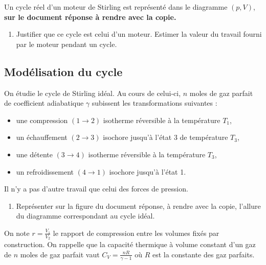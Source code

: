 \documentclass[
  10pt,
  french,
  a4paper,
  DIV=18]{scrartcl}
\providecommand{\tightlist}{%
  \setlength{\itemsep}{0pt}\setlength{\parskip}{0pt}}
\begin{document}
Un cycle réel d'un moteur de Stirling est représenté dans le diagramme
\((p,V)\), \textbf{sur le document réponse à rendre avec la copie.}

\begin{enumerate}
\def\labelenumi{\arabic{enumi}.}
\tightlist
\item
  Justifier que ce cycle est celui d'un moteur. Estimer la valeur du
  travail fourni par le moteur pendant un cycle.
\end{enumerate}

\subsection*{Modélisation du cycle}\label{moduxe9lisation-du-cycle}

On étudie le cycle de Stirling idéal. Au cours de celui-ci, \(n\) moles
de gaz parfait de coefficient adiabatique \(\gamma\) subissent les
transformations suivantes :

\begin{itemize}
\tightlist
\item
  une compression \((1 \to 2)\) isotherme réversible à la température
  \(T_1\),
\item
  un échauffement \((2 \to 3)\) isochore jusqu'à l'état 3 de température
  \(T_3\),
\item
  une détente \((3 \to 4)\) isotherme réversible à la température
  \(T_3\),
\item
  un refroidissement \((4 \to 1)\) isochore jusqu'à l'état 1.
\end{itemize}

Il n'y a pas d'autre travail que celui des forces de pression.

\begin{enumerate}
\def\labelenumi{\arabic{enumi}.}
\setcounter{enumi}{1}
\tightlist
\item
  Représenter sur la figure du document réponse, à rendre avec la copie,
  l'allure du diagramme correspondant au cycle idéal.
\end{enumerate}

On note \(r = \frac{V_1}{V_2}\) le rapport de compression entre les
volumes fixés par construction. On rappelle que la capacité thermique à
volume constant d'un gaz de \(n\) moles de gaz parfait vaut
\(C_V=\frac{nR}{\gamma -1}\) où \(R\) est la constante des gaz parfaits.
\end{document}
